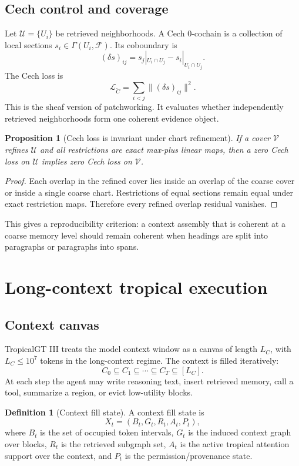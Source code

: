\documentclass[11pt]{article}
\newtheorem{proposition}[theorem]{Proposition}
\theoremstyle{definition}
\newtheorem{definition}[theorem]{Definition}
\theoremstyle{remark}
\newcommand{\LC}{L_C}
\begin{document}
\subsection{Cech control and coverage}

Let \(\mathcal U=\{U_i\}\) be retrieved neighborhoods. A Cech 0-cochain is a collection of local sections \(s_i\in\Gamma(U_i,\mathcal F)\). Its coboundary is
\[
    (\delta s)_{ij}=s_j|_{U_i\cap U_j}-s_i|_{U_i\cap U_j}.
\]
The Cech loss is
\[
    \mathcal L_{\check C}=\sum_{i<j}\| (\delta s)_{ij}\|^2.
\]
This is the sheaf version of patchworking. It evaluates whether independently retrieved neighborhoods form one coherent evidence object.

\begin{proposition}[Cech loss is invariant under chart refinement]
If a cover \(\mathcal V\) refines \(\mathcal U\) and all restrictions are exact max-plus linear maps, then a zero Cech loss on \(\mathcal U\) implies zero Cech loss on \(\mathcal V\).
\end{proposition}
\begin{proof}
Each overlap in the refined cover lies inside an overlap of the coarse cover or inside a single coarse chart. Restrictions of equal sections remain equal under exact restriction maps. Therefore every refined overlap residual vanishes.
\end{proof}

This gives a reproducibility criterion: a context assembly that is coherent at a coarse memory level should remain coherent when headings are split into paragraphs or paragraphs into spans.

\section{Long-context tropical execution}

\subsection{Context canvas}

TropicalGT III treats the model context window as a canvas of length \(\LC\), with \(\LC\le 10^7\) tokens in the long-context regime. The context is filled iteratively:
\[
    C_0\subseteq C_1\subseteq\cdots\subseteq C_T\subseteq [\LC].
\]
At each step the agent may write reasoning text, insert retrieved memory, call a tool, summarize a region, or evict low-utility blocks.

\begin{definition}[Context fill state]
A context fill state is
\[
    X_t=(B_t,G_t,R_t,A_t,P_t),
\]
where \(B_t\) is the set of occupied token intervals, \(G_t\) is the induced context graph over blocks, \(R_t\) is the retrieved subgraph set, \(A_t\) is the active tropical attention support over the context, and \(P_t\) is the permission/provenance state.
\end{definition}
\end{document}
